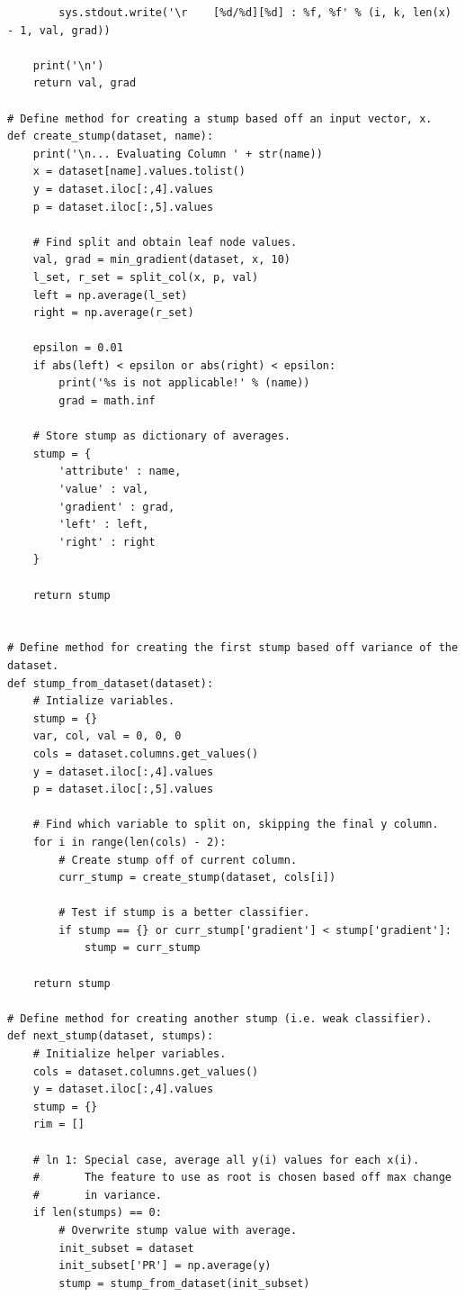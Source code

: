 \documentclass[letterpaper]{article} %
\begin{document}
{\begin{verbatim}
        sys.stdout.write('\r    [%d/%d][%d] : %f, %f' % (i, k, len(x) - 1, val, grad))

    print('\n')
    return val, grad

# Define method for creating a stump based off an input vector, x.
def create_stump(dataset, name):
    print('\n... Evaluating Column ' + str(name))
    x = dataset[name].values.tolist()
    y = dataset.iloc[:,4].values
    p = dataset.iloc[:,5].values

    # Find split and obtain leaf node values.
    val, grad = min_gradient(dataset, x, 10)
    l_set, r_set = split_col(x, p, val)
    left = np.average(l_set)
    right = np.average(r_set)
    
    epsilon = 0.01
    if abs(left) < epsilon or abs(right) < epsilon:
        print('%s is not applicable!' % (name))
        grad = math.inf

    # Store stump as dictionary of averages.
    stump = {
        'attribute' : name,
        'value' : val,
        'gradient' : grad,
        'left' : left,
        'right' : right
    }

    return stump
    

# Define method for creating the first stump based off variance of the dataset.
def stump_from_dataset(dataset):
    # Intialize variables.
    stump = {}
    var, col, val = 0, 0, 0
    cols = dataset.columns.get_values()
    y = dataset.iloc[:,4].values
    p = dataset.iloc[:,5].values

    # Find which variable to split on, skipping the final y column.
    for i in range(len(cols) - 2):
        # Create stump off of current column.
        curr_stump = create_stump(dataset, cols[i])

        # Test if stump is a better classifier.
        if stump == {} or curr_stump['gradient'] < stump['gradient']:
            stump = curr_stump

    return stump

# Define method for creating another stump (i.e. weak classifier).
def next_stump(dataset, stumps):
    # Initialize helper variables.
    cols = dataset.columns.get_values()
    y = dataset.iloc[:,4].values
    stump = {}
    rim = []

    # ln 1: Special case, average all y(i) values for each x(i).
    #       The feature to use as root is chosen based off max change
    #       in variance.
    if len(stumps) == 0:
        # Overwrite stump value with average.
        init_subset = dataset
        init_subset['PR'] = np.average(y)
        stump = stump_from_dataset(init_subset)


\end{verbatim}}
\end{document}

